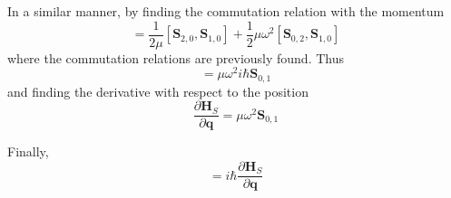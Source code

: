 \documentclass[a4paper]{article}
\theoremstyle{definition}
\begin{document}
In a similar manner, by finding the commutation relation with the momentum
\begin{equation}
	[\textbf{H}_S,\textbf{S}_{1,0}]=\frac{1}{2\mu}[\textbf{S}_{2,0},\textbf{S}_{1,0}]+\frac{1}{2}\mu\omega^2[\textbf{S}_{0,2},\textbf{S}_{1,0}]
\end{equation}
where the commutation relations are previously found. Thus
\begin{equation}
	[\textbf{H}_S,\textbf{S}_{1,0}]=\mu\omega^2i\hbar\textbf{S}_{0,1}
\end{equation}
and finding the derivative with respect to the position
\begin{equation}
	\frac{\partial\textbf{H}_S}{\partial\textbf{q}}=\mu\omega^2\textbf{S}_{0,1}
\end{equation}

Finally,
\begin{equation}
	[\textbf{H}_S,\textbf{p}]=i\hbar\frac{\partial\textbf{H}_S}{\partial\textbf{q}}
\end{equation}
\end{document}
